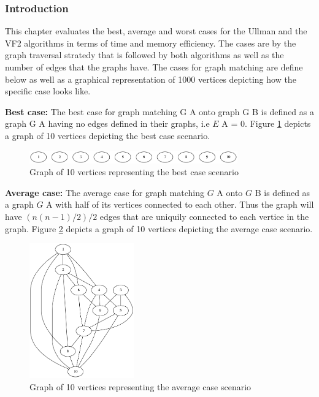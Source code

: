 
\subsubsection{Introduction}
This chapter evaluates the best, average and worst cases for the Ullman and the VF2 algorithms in
terms of time and memory efficiency. The cases are by the graph traversal stratedy that is followed by both algorithms as well as the number of edges that the graphs have.\newline\newline
The cases for graph matching are define below as well as a graphical representation of 1000 vertices 
depicting how the specific case looks like.

\textbf{Best case:} The best case for graph matching G A onto graph G B is defined as a graph G A having
no edges defined in their graphs, i.e $E$ {\tiny A} = 0. Figure \ref{fig:best_case} depicts a graph of 10 vertices depicting the
best case scenario.

\begin{figure}[H]
  \begin{center}
      \includegraphics[width=0.8\textwidth]{best.png}
  \end{center}    
  \caption{Graph of 10 vertices representing the best case scenario}
  \label{fig:best_case}
\end{figure}

\textbf{Average case:} The average case for graph matching $G$ {\tiny A} onto $G$ {\tiny B} is defined as a graph $G$ {\tiny A} with
half of its vertices connected to each other. Thus the graph will have $(n(n − 1)/2)/2$ edges that are uniquily connected to each vertice in 
the graph. Figure \ref{fig:average_case} depicts a graph of 10 vertices depicting the average case scenario.

\begin{figure}[H]
  \begin{center}
      \includegraphics[width=0.4\textwidth]{average.png}
  \end{center}    
  \caption{Graph of 10 vertices representing the average case scenario}
  \label{fig:average_case}
\end{figure}


